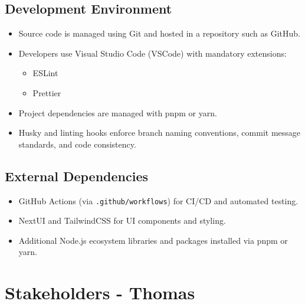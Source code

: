 \documentclass[12pt]{article}
\begin{document}
    \subsection{Development Environment}
    \begin{itemize}
        \item Source code is managed using Git and hosted in a repository such as GitHub.
        \item Developers use Visual Studio Code (VSCode) with mandatory extensions:
        \begin{itemize}
            \item ESLint
            \item Prettier
        \end{itemize}
        \item Project dependencies are managed with pnpm or yarn.
        \item Husky and linting hooks enforce branch naming conventions, commit message standards, and code consistency.
    \end{itemize}

    \subsection{External Dependencies}
    \begin{itemize}
        \item GitHub Actions (via \texttt{.github/workflows}) for CI/CD and automated testing.
        \item NextUI and TailwindCSS for UI components and styling.
        \item Additional Node.js ecosystem libraries and packages installed via pnpm or yarn.
    \end{itemize}


\section{Stakeholders - Thomas}
\end{document}
